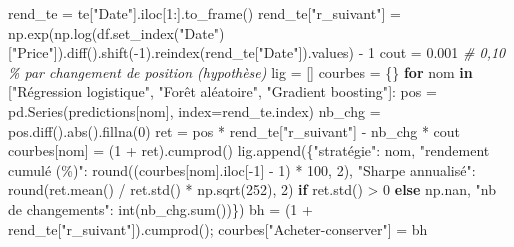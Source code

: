 \documentclass[
  10pt,
]{article}
\newenvironment{Shaded}{}{}
\newcommand{\BuiltInTok}[1]{\textcolor[rgb]{0.00,0.50,0.00}{#1}}
\newcommand{\CommentTok}[1]{\textcolor[rgb]{0.38,0.63,0.69}{\textit{#1}}}
\newcommand{\ControlFlowTok}[1]{\textcolor[rgb]{0.00,0.44,0.13}{\textbf{#1}}}
\newcommand{\DecValTok}[1]{\textcolor[rgb]{0.25,0.63,0.44}{#1}}
\newcommand{\FloatTok}[1]{\textcolor[rgb]{0.25,0.63,0.44}{#1}}
\newcommand{\KeywordTok}[1]{\textcolor[rgb]{0.00,0.44,0.13}{\textbf{#1}}}
\newcommand{\NormalTok}[1]{#1}
\newcommand{\OperatorTok}[1]{\textcolor[rgb]{0.40,0.40,0.40}{#1}}
\newcommand{\StringTok}[1]{\textcolor[rgb]{0.25,0.44,0.63}{#1}}
\begin{document}
\begin{Shaded}
\begin{Highlighting}[]
\NormalTok{rend\_te }\OperatorTok{=}\NormalTok{ te[}\StringTok{"Date"}\NormalTok{].iloc[}\DecValTok{1}\NormalTok{:].to\_frame()}
\NormalTok{rend\_te[}\StringTok{"r\_suivant"}\NormalTok{] }\OperatorTok{=}\NormalTok{ np.exp(np.log(df.set\_index(}\StringTok{"Date"}\NormalTok{)[}\StringTok{"Price"}\NormalTok{]).diff().shift(}\OperatorTok{{-}}\DecValTok{1}\NormalTok{).reindex(rend\_te[}\StringTok{"Date"}\NormalTok{]).values) }\OperatorTok{{-}} \DecValTok{1}
\NormalTok{cout }\OperatorTok{=} \FloatTok{0.001}                                           \CommentTok{\# 0,10 \% par changement de position (hypothèse)}
\NormalTok{lig }\OperatorTok{=}\NormalTok{ []}
\NormalTok{courbes }\OperatorTok{=}\NormalTok{ \{\}}
\ControlFlowTok{for}\NormalTok{ nom }\KeywordTok{in}\NormalTok{ [}\StringTok{"Régression logistique"}\NormalTok{, }\StringTok{"Forêt aléatoire"}\NormalTok{, }\StringTok{"Gradient boosting"}\NormalTok{]:}
\NormalTok{    pos }\OperatorTok{=}\NormalTok{ pd.Series(predictions[nom], index}\OperatorTok{=}\NormalTok{rend\_te.index)}
\NormalTok{    nb\_chg }\OperatorTok{=}\NormalTok{ pos.diff().}\BuiltInTok{abs}\NormalTok{().fillna(}\DecValTok{0}\NormalTok{)}
\NormalTok{    ret }\OperatorTok{=}\NormalTok{ pos }\OperatorTok{*}\NormalTok{ rend\_te[}\StringTok{"r\_suivant"}\NormalTok{] }\OperatorTok{{-}}\NormalTok{ nb\_chg }\OperatorTok{*}\NormalTok{ cout}
\NormalTok{    courbes[nom] }\OperatorTok{=}\NormalTok{ (}\DecValTok{1} \OperatorTok{+}\NormalTok{ ret).cumprod()}
\NormalTok{    lig.append(\{}\StringTok{"stratégie"}\NormalTok{: nom, }\StringTok{"rendement cumulé (\%)"}\NormalTok{: }\BuiltInTok{round}\NormalTok{((courbes[nom].iloc[}\OperatorTok{{-}}\DecValTok{1}\NormalTok{] }\OperatorTok{{-}} \DecValTok{1}\NormalTok{) }\OperatorTok{*} \DecValTok{100}\NormalTok{, }\DecValTok{2}\NormalTok{),}
                \StringTok{"Sharpe annualisé"}\NormalTok{: }\BuiltInTok{round}\NormalTok{(ret.mean() }\OperatorTok{/}\NormalTok{ ret.std() }\OperatorTok{*}\NormalTok{ np.sqrt(}\DecValTok{252}\NormalTok{), }\DecValTok{2}\NormalTok{) }\ControlFlowTok{if}\NormalTok{ ret.std() }\OperatorTok{\textgreater{}} \DecValTok{0} \ControlFlowTok{else}\NormalTok{ np.nan,}
                \StringTok{"nb de changements"}\NormalTok{: }\BuiltInTok{int}\NormalTok{(nb\_chg.}\BuiltInTok{sum}\NormalTok{())\})}
\NormalTok{bh }\OperatorTok{=}\NormalTok{ (}\DecValTok{1} \OperatorTok{+}\NormalTok{ rend\_te[}\StringTok{"r\_suivant"}\NormalTok{]).cumprod()}\OperatorTok{;}\NormalTok{ courbes[}\StringTok{"Acheter{-}conserver"}\NormalTok{] }\OperatorTok{=}\NormalTok{ bh}

\end{Highlighting}
\end{Shaded}
\end{document}
